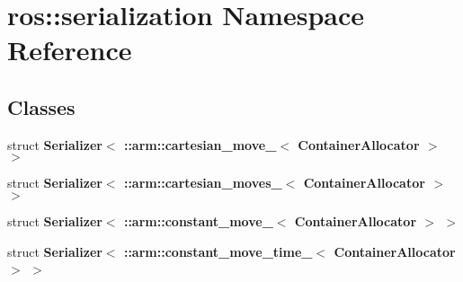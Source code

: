 \section{ros\-:\-:serialization \-Namespace \-Reference}
\label{namespaceros_1_1serialization}
\subsection*{\-Classes}
\begin{DoxyCompactItemize}
\item 
struct {\bf \-Serializer$<$ \-::arm\-::cartesian\-\_\-move\-\_\-$<$ Container\-Allocator $>$ $>$}
\item 
struct {\bf \-Serializer$<$ \-::arm\-::cartesian\-\_\-moves\-\_\-$<$ Container\-Allocator $>$ $>$}
\item 
struct {\bf \-Serializer$<$ \-::arm\-::constant\-\_\-move\-\_\-$<$ Container\-Allocator $>$ $>$}
\item 
struct {\bf \-Serializer$<$ \-::arm\-::constant\-\_\-move\-\_\-time\-\_\-$<$ Container\-Allocator $>$ $>$}
\end{DoxyCompactItemize}
